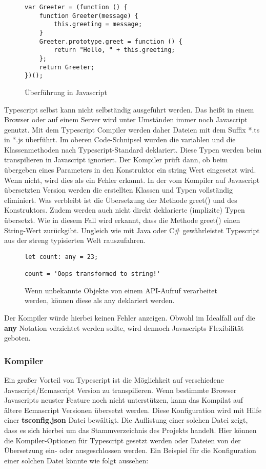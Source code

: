\begin{figure}[H]
\begin{lstlisting}[basicstyle=\small]
var Greeter = (function () {
    function Greeter(message) {
        this.greeting = message;
    }
    Greeter.prototype.greet = function () {
        return "Hello, " + this.greeting;
    };
    return Greeter;
})(); 
\end{lstlisting}
\caption{Überführung in Javascript \cite{typescript-example}}
\end{figure}

\noindent
Typescript selbst kann nicht selbständig ausgeführt werden. Das heißt in einem Browser oder auf einem Server wird unter Umständen immer noch Javascript genutzt. Mit dem Typescript Compiler werden daher Dateien mit dem Suffix *.ts in *.js überführt. Im oberen Code-Schnipsel wurden die variablen und die Klassenmethoden nach Typescript-Standard deklariert. Diese Typen werden beim transpilieren in Javascript ignoriert. Der Kompiler prüft dann, ob beim übergeben eines Parameters in den Konstruktor ein string Wert eingesetzt wird. Wenn nicht, wird dies als ein Fehler erkannt. In der vom Kompiler auf Javascript übersetzten Version werden die erstellten Klassen und Typen vollständig eliminiert. Was verbleibt ist die Übersetzung der Methode greet() und des Konstruktors. Zudem werden auch nicht direkt deklarierte (implizite) Typen übersetzt. Wie in diesem Fall wird erkannt, dass die Methode greet() einen String-Wert zurückgibt. Ungleich wie mit Java oder C\# gewährleistet Typescript aus der streng typisierten Welt rauszufahren.

\begin{figure}[H]
\begin{lstlisting}[basicstyle=\small]
let count: any = 23;

count = 'Oops transformed to string!'
\end{lstlisting}
\caption{Wenn unbekannte Objekte von einem API-Aufruf verarbeitet werden, können diese als any deklariert werden.}
\end{figure}

\noindent
Der Kompiler würde hierbei keinen Fehler anzeigen. Obwohl im Idealfall auf die \textbf{any} Notation verzichtet werden sollte, wird dennoch Javascripts Flexibilität geboten. 

\subsubsection{Kompiler}
Ein großer Vorteil von Typescript ist die Möglichkeit auf verschiedene Javascript/Ecmascript Version zu transpilieren. Wenn bestimmte Browser Javascripts neuster Feature noch nicht unterstützen, kann das Kompilat auf ältere Ecmascript Versionen übersetzt werden. Diese Konfiguration wird mit Hilfe einer \textbf{tsconfig.json} Datei bewältigt. Die Auflistung einer solchen Datei zeigt, dass es sich hierbei um das Stammverzeichnis des Projekts handelt. Hier können die Kompiler-Optionen für Typescript gesetzt werden oder Dateien von der Übersetzung ein- oder ausgeschlossen werden. Ein Beispiel für die Konfiguration einer solchen Datei könnte wie folgt aussehen: 

